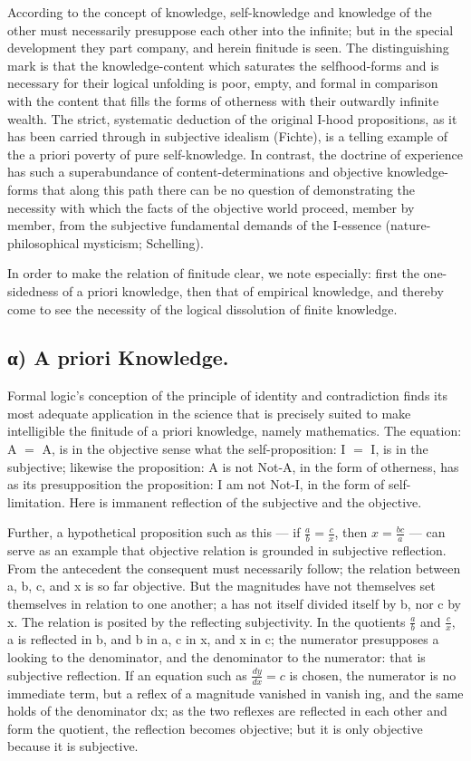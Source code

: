 \documentclass[12pt]{book}
\begin{document}
According to the concept of knowledge, self-knowledge and knowledge
of the other must necessarily presuppose each other into the
infinite; but in the special development they part company, and
herein finitude is seen. The distinguishing mark is that the
knowledge-content which saturates the selfhood-forms and is
necessary for their logical unfolding is poor, empty, and formal in
comparison with the content that fills the forms of otherness with
their outwardly infinite wealth. The strict, systematic deduction of
the original I-hood propositions, as it has been carried through in
subjective idealism (Fichte), is a telling example of the a priori
poverty of pure self-knowledge. In contrast, the doctrine of
experience has such a superabundance of content-determinations and
objective knowledge-forms that
along this path there can be no question of demonstrating the
necessity with which the facts of the objective world proceed,
member by member, from the subjective fundamental demands of the
I-essence (nature-philosophical mysticism; Schelling).

In order to make the relation of finitude clear, we note especially:
first the one-sidedness of a priori knowledge, then that of
empirical knowledge, and thereby come to see the necessity of the
logical dissolution of finite knowledge.

\subsection*{α) A priori Knowledge.}

Formal logic's conception of the principle of identity and
contradiction finds its most adequate application in the science
that is precisely suited to make intelligible the finitude of a
priori knowledge, namely mathematics. The equation: A $=$ A, is in
the objective sense what the self-proposition: I $=$ I, is in the
subjective; likewise the proposition: A is not Not-A, in the form of
otherness, has as its presupposition the proposition: I am not
Not-I, in the form of self-limitation. Here is immanent reflection
of the subjective and the objective.

Further, a hypothetical proposition such as this --- if
$\frac{a}{b} = \frac{c}{x}$, then $x = \frac{bc}{a}$ --- can serve
as an example that objective relation is grounded in subjective
reflection. From the antecedent the consequent must necessarily
follow; the relation between a, b, c, and x is so far objective. But
the magnitudes have not themselves set themselves in relation to one
another; a has not itself divided itself by b, nor c by x. The
relation is posited by the reflecting subjectivity. In the quotients
$\frac{a}{b}$ and $\frac{c}{x}$, a is reflected in b, and b in a, c
in x, and x in c; the numerator presupposes a looking to the
denominator, and the denominator to the numerator: that is
subjective reflection. If an equation such as $\frac{dy}{dx} = c$ is
chosen, the numerator is no immediate term, but a reflex of a
magnitude vanished in vanish\-%
ing, and the same holds of the denominator dx; as the two reflexes
are reflected in each other and form the quotient, the reflection
becomes objective; but it is only objective because it is
subjective.
\end{document}
